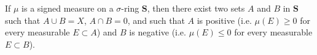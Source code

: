 If $\mu$ is a signed measure on a $\sigma$-ring $\mathbf{S}$, then there exist two sets $A$ and $B$ in $\mathbf{S}$ such that $A \cup B = X$, $A \cap B = 0$, and such that $A$ is positive (i.e. $\mu(E) \geq 0$ for every measurable $E \subset A$) and $B$ is negative (i.e. $\mu(E) \leq 0$ for every measurable $E \subset B$).
